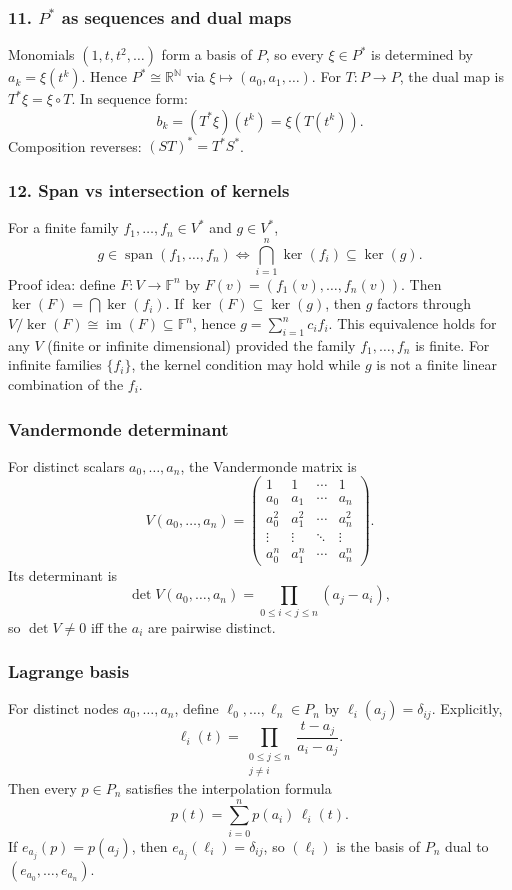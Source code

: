 \documentclass[12pt,a4paper]{article}
\theoremstyle{plain}
\theoremstyle{definition}      %
\begin{document}
\subsubsection*{11. \(P^*\) as sequences and dual maps}
Monomials \((1,t,t^2,\dots)\) form a basis of \(P\), so every \(\xi\in P^*\) is determined by \(a_k=\xi(t^k)\).
Hence \(P^*\cong \mathbb R^{\mathbb N}\) via \(\xi\mapsto (a_0,a_1,\dots)\).
For \(T:P\to P\), the dual map is \(T^*\xi=\xi\circ T\). In sequence form:
\[
b_k=(T^*\xi)(t^k)=\xi(T(t^k)).
\]
Composition reverses: \((ST)^*=T^*S^*\).

\subsubsection*{12. Span vs intersection of kernels}
For a finite family \(f_1,\dots,f_n\in V^*\) and \(g\in V^*\),
\[
g\in \operatorname{span}(f_1,\dots,f_n)
\iff
\bigcap_{i=1}^n \ker(f_i)\subseteq \ker(g).
\]
Proof idea: define \(F:V\to\mathbb F^n\) by \(F(v)=(f_1(v),\dots,f_n(v))\). Then \(\ker(F)=\bigcap\ker(f_i)\).
If \(\ker(F)\subseteq\ker(g)\), then \(g\) factors through \(V/\ker(F)\cong \operatorname{im}(F)\subseteq\mathbb F^n\), hence
\(g=\sum_{i=1}^n c_i f_i\).
This equivalence holds for any \(V\) (finite or infinite dimensional) provided the family \(f_1,\dots,f_n\) is finite.
For infinite families \(\{f_i\}\), the kernel condition may hold while \(g\) is not a finite linear combination of the \(f_i\).


\subsubsection*{Vandermonde determinant}
For distinct scalars \(a_0,\dots,a_n\), the Vandermonde matrix is
\[
V(a_0,\dots,a_n)=
\begin{pmatrix}
	1 & 1 & \cdots & 1\\
	a_0 & a_1 & \cdots & a_n\\
	a_0^2 & a_1^2 & \cdots & a_n^2\\
	\vdots & \vdots & \ddots & \vdots\\
	a_0^n & a_1^n & \cdots & a_n^n
\end{pmatrix}.
\]
Its determinant is
\[
\det V(a_0,\dots,a_n)=\prod_{0\le i<j\le n}(a_j-a_i),
\]
so \(\det V\neq 0\) iff the \(a_i\) are pairwise distinct.

\subsubsection*{Lagrange basis}
For distinct nodes \(a_0,\dots,a_n\), define \(\ell_0,\dots,\ell_n\in P_n\) by
\(\ell_i(a_j)=\delta_{ij}\). Explicitly,
\[
\ell_i(t)=\prod_{\substack{0\le j\le n\\ j\ne i}}\frac{t-a_j}{a_i-a_j}.
\]
Then every \(p\in P_n\) satisfies the interpolation formula
\[
p(t)=\sum_{i=0}^n p(a_i)\,\ell_i(t).
\]
If \(e_{a_j}(p)=p(a_j)\), then \(e_{a_j}(\ell_i)=\delta_{ij}\), so \((\ell_i)\) is the basis of \(P_n\) dual to
\((e_{a_0},\dots,e_{a_n})\).
\end{document}
